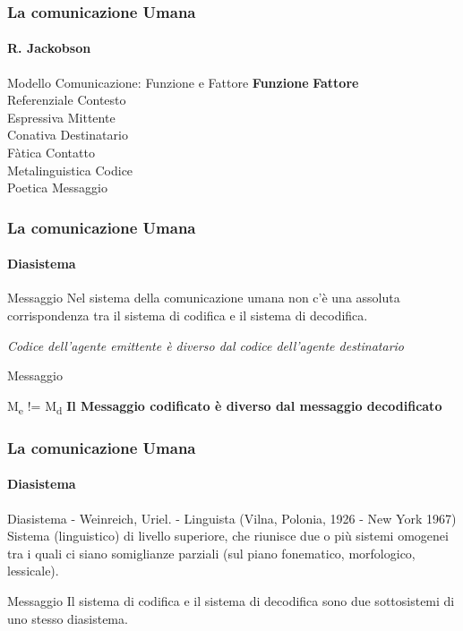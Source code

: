 \begin{frame}
	\frametitle{La comunicazione Umana}
	\framesubtitle{R. Jackobson}
	\addtocounter{nframe}{1}

	\begin{block}{Modello Comunicazione: Funzione e Fattore}
		\textbf{Funzione}        \textbf{Fattore}
		\\Referenziale    Contesto
		\\Espressiva      Mittente
		\\Conativa        Destinatario
		\\Fàtica          Contatto
		\\Metalinguistica Codice
		\\Poetica         Messaggio
	\end{block}

\end{frame}

\begin{frame}
	\frametitle{La comunicazione Umana}
	\framesubtitle{Diasistema}
	\addtocounter{nframe}{1}

	\begin{block}{Messaggio}
		Nel sistema della comunicazione umana non c'è una assoluta corrispondenza tra il sistema di codifica e il sistema di decodifica.
		\begin{center}
			\textit{Codice dell'agente emittente è diverso dal codice dell'agente destinatario}
		\end{center}
	\end{block}

	\begin{block}{Messaggio}
		\begin{center}
			M\textsubscript{e} != M\textsubscript{d}
			\textbf{Il Messaggio codificato è diverso dal messaggio decodificato}
		\end{center}
	\end{block}

\end{frame}

\begin{frame}
	\frametitle{La comunicazione Umana}
	\framesubtitle{Diasistema}
	\addtocounter{nframe}{1}

	\begin{block}{Diasistema - Weinreich, Uriel. - Linguista (Vilna, Polonia, 1926 - New York 1967)}
		Sistema (linguistico) di livello superiore, che riunisce due o più sistemi omogenei tra i quali ci siano somiglianze parziali (sul piano fonematico, morfologico, lessicale).
	\end{block}

	\begin{block}{Messaggio}
		Il sistema di codifica e il sistema di decodifica sono due sottosistemi di uno stesso diasistema.
	\end{block}

\end{frame}

